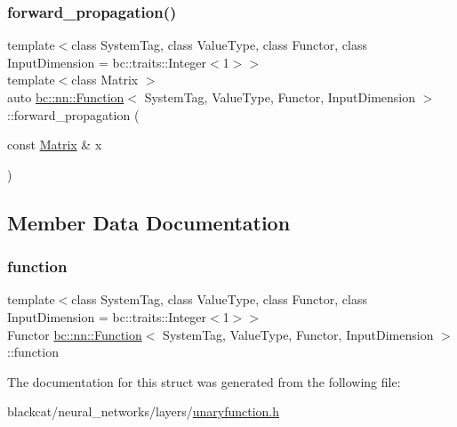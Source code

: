 \mbox{\label{structbc_1_1nn_1_1Function_a516b68e5ff7077887e30a2a6df73a64b}} 
\subsubsection{\texorpdfstring{forward\+\_\+propagation()}{forward\_propagation()}}
{\footnotesize\ttfamily template$<$class System\+Tag, class Value\+Type, class Functor, class Input\+Dimension = bc\+::traits\+::\+Integer$<$1$>$$>$ \\
template$<$class Matrix $>$ \\
auto \hyperlink{structbc_1_1nn_1_1Function}{bc\+::nn\+::\+Function}$<$ System\+Tag, Value\+Type, Functor, Input\+Dimension $>$\+::forward\+\_\+propagation (\begin{DoxyParamCaption}\item[{const \hyperlink{namespacebc_a92dd1e243183b382432a5fac3ed8b89f}{Matrix} \&}]{x }\end{DoxyParamCaption})\hspace{0.3cm}{\ttfamily [inline]}}



\subsection{Member Data Documentation}
\mbox{\label{structbc_1_1nn_1_1Function_a5fd3a0023d9abfe4ce4dc513863a6d06}} 
\subsubsection{\texorpdfstring{function}{function}}
{\footnotesize\ttfamily template$<$class System\+Tag, class Value\+Type, class Functor, class Input\+Dimension = bc\+::traits\+::\+Integer$<$1$>$$>$ \\
Functor \hyperlink{structbc_1_1nn_1_1Function}{bc\+::nn\+::\+Function}$<$ System\+Tag, Value\+Type, Functor, Input\+Dimension $>$\+::function}



The documentation for this struct was generated from the following file\+:\begin{DoxyCompactItemize}
\item 
blackcat/neural\+\_\+networks/layers/\hyperlink{unaryfunction_8h}{unaryfunction.\+h}\end{DoxyCompactItemize}
